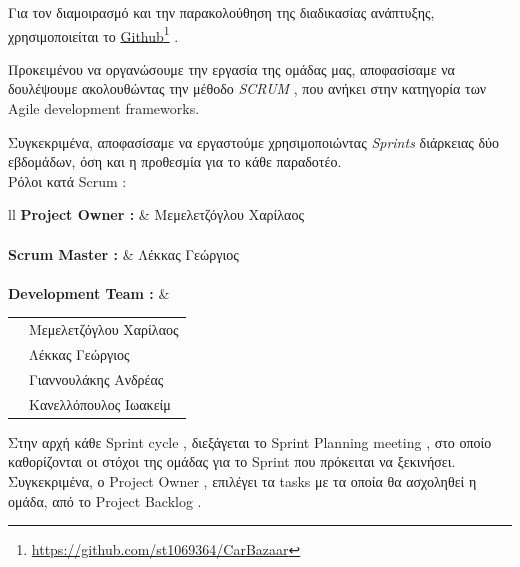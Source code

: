 \documentclass{../ol-softwaremanual}
\newcommand{\doclink}[2]{\href{#1}{#2}\footnote{\url{#1}}}
\begin{document}
	
	Για τον διαμοιρασμό και την παρακολούθηση της διαδικασίας ανάπτυξης, χρησιμοποιείται το \en \doclink{https://github.com/st1069364/CarBazaar}{Github} \gr.
	
	
	
	\newpage
	
	\flushleft
	Προκειμένου να οργανώσουμε την εργασία της ομάδας μας, αποφασίσαμε να δουλέψουμε ακολουθώντας την μέθοδο \en \textit{SCRUM} \gr , που ανήκει στην κατηγορία των \en Agile development frameworks. \gr
	
	Συγκεκριμένα, αποφασίσαμε να εργαστούμε χρησιμοποιώντας \en \textit{Sprints} \gr διάρκειας δύο εβδομάδων, όση και η προθεσμία για το κάθε παραδοτέο. \\ 
	
	Ρόλοι κατά \en Scrum \gr : \newline
	
	
	\flushleft
	\begin{tabular}{ll}
		\en \textbf{Project Owner : }  & \gr \hspace{5mm}  Μεμελετζόγλου Χαρίλαος \\
		\\ \en \textbf{Scrum Master : } &  \gr \hspace{5mm} Λέκκας Γεώργιος \\
		
		\\ \en \textbf{Development Team : } & \begin{tabular}[t]{ll}
			&  \gr  Μεμελετζόγλου Χαρίλαος  \\
			& \gr     Λέκκας Γεώργιος \\
			& \gr     Γιαννουλάκης Ανδρέας \\
			& \gr     Κανελλόπουλος Ιωακείμ \\
		\end{tabular} 
	\end{tabular} \linebreak
	
	\vspace{20pt}
	
	Στην αρχή κάθε \en Sprint cycle \gr , διεξάγεται το \en Sprint Planning meeting \gr , στο οποίο καθορίζονται οι στόχοι της ομάδας για το \en Sprint \gr που πρόκειται να ξεκινήσει. Συγκεκριμένα, ο \en Project Owner \gr , επιλέγει τα \en tasks \gr με τα οποία θα ασχοληθεί η ομάδα, από το \en Project Backlog \gr . \\
	
	\vspace{5pt}
	
\end{document}
